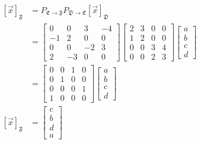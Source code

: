 \documentclass{report}
\begin{document}
\[
\begin{aligned}
[\vec{x}]_{\mathfrak{F}} & = P_{\mathfrak{E}\rightarrow\mathfrak{F}}P_{\mathfrak{D}\rightarrow\mathfrak{E}}[\vec{x}]_{\mathfrak{D}} \\
& = \begin{bmatrix} 
0 & 0 & 3 & -4 \\
-1 & 2 & 0 & 0 \\
0 & 0 & -2 & 3 \\
2 & -3 & 0 & 0
\end{bmatrix} \begin{bmatrix}
2 & 3 & 0 & 0 \\
1 & 2 & 0 & 0 \\
0 & 0 & 3 & 4 \\
0 & 0 & 2 & 3
\end{bmatrix} \begin{bmatrix}
a \\ b \\ c \\ d
\end{bmatrix} \\
& = \begin{bmatrix}
0 & 0 & 1 & 0 \\
0 & 1 & 0 & 0 \\
0 & 0 & 0 & 1 \\
1 & 0 & 0 & 0
\end{bmatrix} \begin{bmatrix}
a \\ b \\ c \\ d
\end{bmatrix} \\
[\vec{x}]_{\mathfrak{F}} & = \begin{bmatrix}
c \\ b \\ d \\ a
\end{bmatrix}
\end{aligned}
\]
\end{document}

